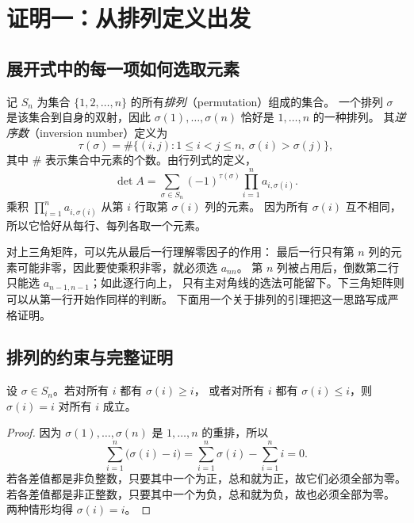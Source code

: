 \documentclass[UTF8,12pt,a4paper,fontset=fandol]{ctexart}
\begin{document}
\section{证明一：从排列定义出发}
\label{sec:permutation-proof}

\subsection{展开式中的每一项如何选取元素}

记 $S_n$ 为集合 $\{1,2,\ldots,n\}$ 的所有\emph{排列}（permutation）组成的集合。
一个排列 $\sigma$ 是该集合到自身的双射，因此
$\sigma(1),\ldots,\sigma(n)$ 恰好是 $1,\ldots,n$ 的一种排列。
其\emph{逆序数}（inversion number）定义为
\[
  \tau(\sigma)
  =\#\{(i,j):1\leq i<j\leq n,\ \sigma(i)>\sigma(j)\},
\]
其中 $\#$ 表示集合中元素的个数。由行列式的定义，
\begin{equation}
  \det A
  =\sum_{\sigma\in S_n}(-1)^{\tau(\sigma)}
    \prod_{i=1}^{n}a_{i,\sigma(i)}.
  \label{eq:leibniz-formula}
\end{equation}
乘积 $\prod_{i=1}^{n}a_{i,\sigma(i)}$ 从第 $i$ 行取第 $\sigma(i)$ 列的元素。
因为所有 $\sigma(i)$ 互不相同，所以它恰好从每行、每列各取一个元素。

对上三角矩阵，可以先从最后一行理解零因子的作用：
最后一行只有第 $n$ 列的元素可能非零，因此要使乘积非零，就必须选 $a_{nn}$。
第 $n$ 列被占用后，倒数第二行只能选 $a_{n-1,n-1}$；如此逐行向上，
只有主对角线的选法可能留下。下三角矩阵则可以从第一行开始作同样的判断。
下面用一个关于排列的引理把这一思路写成严格证明。

\subsection{排列的约束与完整证明}

\begin{lemma}
\label{lem:one-sided-permutation}
设 $\sigma\in S_n$。若对所有 $i$ 都有 $\sigma(i)\geq i$，
或者对所有 $i$ 都有 $\sigma(i)\leq i$，则 $\sigma(i)=i$ 对所有 $i$ 成立。
\end{lemma}

\begin{proof}
因为 $\sigma(1),\ldots,\sigma(n)$ 是 $1,\ldots,n$ 的重排，所以
\[
  \sum_{i=1}^{n}\bigl(\sigma(i)-i\bigr)
  =\sum_{i=1}^{n}\sigma(i)-\sum_{i=1}^{n}i=0.
\]
若各差值都是非负整数，只要其中一个为正，总和就为正，故它们必须全部为零。
若各差值都是非正整数，只要其中一个为负，总和就为负，故也必须全部为零。
两种情形均得 $\sigma(i)=i$。
\end{proof}
\end{document}
